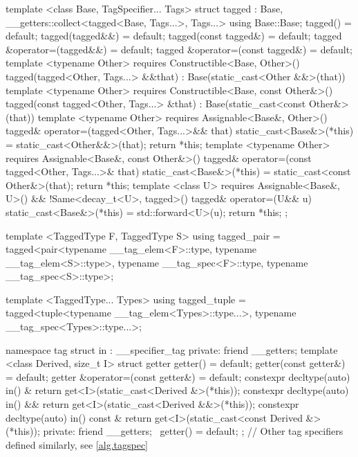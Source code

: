 \begin{codeblock}
{{{{  template <class Base, TagSpecifier... Tags>
  struct tagged
    : Base, __getters::collect<tagged<Base, Tags...>, Tags...> {
    using Base::Base;
    tagged() = default;
    tagged(tagged&&) = default;
    tagged(const tagged&) = default;
    tagged &operator=(tagged&&) = default;
    tagged &operator=(const tagged&) = default;
    template <typename Other>
      requires Constructible<Base, Other>()
    tagged(tagged<Other, Tags...> &&that)
      : Base(static_cast<Other &&>(that)) { }
    template <typename Other>
      requires Constructible<Base, const Other&>()
    tagged(const tagged<Other, Tags...> &that)
      : Base(static_cast<const Other&>(that)) { }
    template <typename Other>
      requires Assignable<Base&, Other>()
    tagged& operator=(tagged<Other, Tags...>&& that) {
      static_cast<Base&>(*this) = static_cast<Other&&>(that);
      return *this;
    }
    template <typename Other>
      requires Assignable<Base&, const Other&>()
    tagged& operator=(const tagged<Other, Tags...>& that) {
      static_cast<Base&>(*this) = static_cast<const Other&>(that);
      return *this;
    }
    template <class U>
      requires Assignable<Base&, U>() && !Same<decay_t<U>, tagged>()
    tagged& operator=(U&& u) {
      static_cast<Base&>(*this) = std::forward<U>(u);
      return *this;
    }
  };

  template <TaggedType F, TaggedType S>
  using tagged_pair =
    tagged<pair<typename __tag_elem<F>::type, typename __tag_elem<S>::type>,
           typename __tag_spec<F>::type, typename __tag_spec<S>::type>;

  template <TaggedType... Types>
  using tagged_tuple =
    tagged<tuple<typename __tag_elem<Types>::type...>,
           typename __tag_spec<Types>::type...>;

  namespace tag {
    struct in : __specifier_tag {
    private:
      friend __getters;
      template <class Derived, size_t I>
      struct getter {
        getter() = default;
        getter(const getter&) = default;
        getter &operator=(const getter&) = default;
        constexpr decltype(auto) in() & {
          return get<I>(static_cast<Derived &>(*this));
        }
        constexpr decltype(auto) in() && {
          return get<I>(static_cast<Derived &&>(*this));
        }
        constexpr decltype(auto) in() const & {
          return get<I>(static_cast<const Derived &>(*this));
        }
      private:
        friend __getters;
        ~getter() = default;
      };
    }
    // Other tag specifiers defined similarly, see \ref{alg.tagspec}
  }
}}}}
\end{codeblock}
